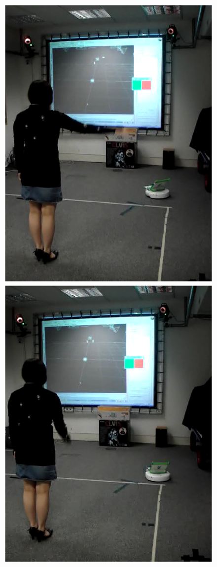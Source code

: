 \documentclass[12pt,a4,notitlepage]{report}
\renewcommand{\_}{\texttt{\symbol{95}}}
\newcommand{\<}{\texttt{\symbol{60}}}
\renewcommand{\>}{\texttt{\symbol{62}}}
\begin{document}
\begin{figure}
\includegraphics[scale=0.15,angle=0]{images/live4.ps}
\includegraphics[scale=0.15,angle=0]{images/live5.ps}

\end{figure}
\end{document}
